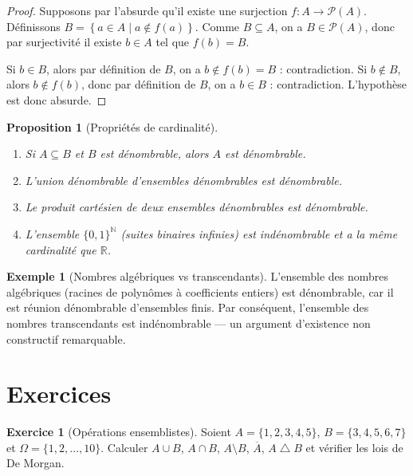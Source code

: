 \documentclass[12pt,a4paper,openany]{book}
\theoremstyle{definition}
\newtheorem{exemple}[definition]{Exemple}
\newtheorem{exercice}{Exercice}[chapter]
\theoremstyle{plain}
\newtheorem{proposition}[definition]{Proposition}
\theoremstyle{remark}
\newcommand{\N}{\mathbb{N}}
\newcommand{\R}{\mathbb{R}}
\newcommand{\set}[1]{\left\{#1\right\}}
\newcommand{\powerset}{\mathcal{P}}
\begin{document}
\begin{proof}
Supposons par l'absurde qu'il existe une surjection $f \colon A \to \powerset(A)$.
Définissons $B = \set{a \in A \mid a \notin f(a)}$. Comme $B \subseteq A$, on
a $B \in \powerset(A)$, donc par surjectivité il existe $b \in A$ tel que
$f(b) = B$.

Si $b \in B$, alors par définition de $B$, on a $b \notin f(b) = B$ :
contradiction. Si $b \notin B$, alors $b \notin f(b)$, donc par définition de
$B$, on a $b \in B$ : contradiction. L'hypothèse est donc absurde.
\end{proof}

\begin{proposition}[Propriétés de cardinalité]\label{prop:card-props}
\begin{enumerate}
  \item Si $A \subseteq B$ et $B$ est dénombrable, alors $A$ est dénombrable.
  \item L'union dénombrable d'ensembles dénombrables est dénombrable.
  \item Le produit cartésien de deux ensembles dénombrables est dénombrable.
  \item L'ensemble $\{0,1\}^{\N}$ (suites binaires infinies) est
    indénombrable et a la même cardinalité que $\R$.
\end{enumerate}
\end{proposition}

\begin{exemple}[Nombres algébriques vs transcendants]\label{ex:algebriques}
L'ensemble des nombres algébriques (racines de polynômes à coefficients
entiers) est dénombrable, car il est réunion dénombrable d'ensembles finis.
Par conséquent, l'ensemble des nombres transcendants est indénombrable ---
un argument d'existence non constructif remarquable.
\end{exemple}

\section{Exercices}\label{sec:exo-ch3}

\begin{exercice}[Opérations ensemblistes]\label{exo:ops-ensembles}
Soient $A = \{1,2,3,4,5\}$, $B = \{3,4,5,6,7\}$ et
$\Omega = \{1,2,\ldots,10\}$. Calculer $A \cup B$, $A \cap B$,
$A \setminus B$, $\overline{A}$, $A \bigtriangleup B$ et vérifier les lois
de De Morgan.
\end{exercice}
\end{document}
